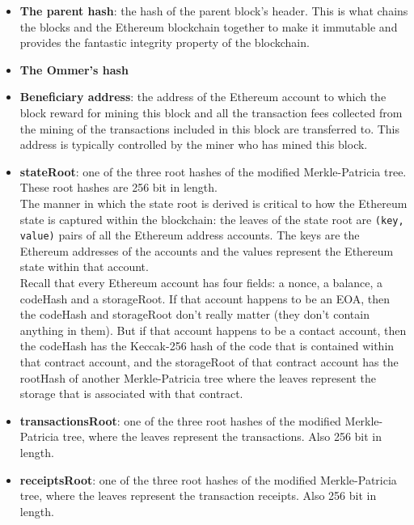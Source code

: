 \begin{itemize}

    \item\textbf{The parent hash}: the hash of the parent block's header.
    This is what chains the blocks and the Ethereum blockchain together to make it immutable and provides the fantastic integrity property of the blockchain.

    \item\textbf{The Ommer's hash} %

    \item\textbf{Beneficiary address}: the address of the Ethereum account to which the block reward for mining this block and all the transaction fees collected from the mining of the transactions included in this block are transferred to.
    This address is typically controlled by the miner who has mined this block.

    \item\textbf{stateRoot}: one of the three root hashes of the modified Merkle-Patricia tree.
    These root hashes are 256 bit in length.\\
    
    The manner in which the state root is derived is critical to how the Ethereum state is captured within the blockchain: the leaves of the state root are \texttt{(key, value)} pairs of all the Ethereum address accounts.
    The keys are the Ethereum addresses of the accounts and the values represent the Ethereum state within that account.\\
    
    Recall that every Ethereum account has four fields: a nonce, a balance, a codeHash and a storageRoot.
    If that account happens to be an EOA, then the codeHash and storageRoot don't really matter (they don't contain anything in them).
    But if that account happens to be a contact account, then the codeHash has the Keccak-256 hash of the code that is contained within that contract account, and the storageRoot of that contract account has the rootHash of another Merkle-Patricia tree where the leaves represent the storage that is associated with that contract.

    \item\textbf{transactionsRoot}: one of the three root hashes of the modified Merkle-Patricia tree, where the leaves represent the transactions.
    Also 256 bit in length.

    \item\textbf{receiptsRoot}: one of the three root hashes of the modified Merkle-Patricia tree, where the leaves represent the transaction receipts.
    Also 256 bit in length.\\


\end{itemize}
